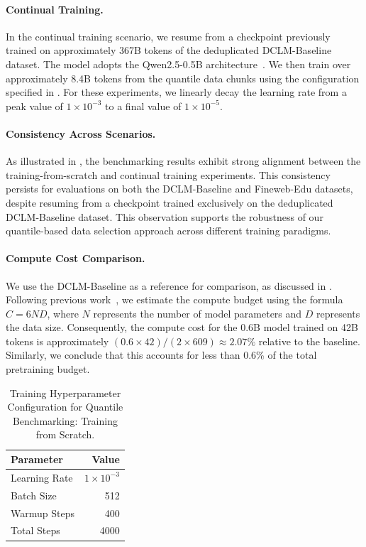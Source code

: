 \paragraph{Continual Training.}
In the continual training scenario, we resume from a checkpoint previously trained on approximately 367B tokens of the deduplicated DCLM-Baseline dataset. The model adopts the Qwen2.5-0.5B architecture~\citep{qwen2025qwen25technicalreport}. We then train over approximately 8.4B tokens from the quantile data chunks using the configuration specified in . For these experiments, we linearly decay the learning rate from a peak value of $1\times10^{-3}$ to a final value of $1\times10^{-5}$.

\paragraph{Consistency Across Scenarios.}
As illustrated in , the benchmarking results exhibit strong alignment between the training-from-scratch and continual training experiments. This consistency persists for evaluations on both the DCLM-Baseline and Fineweb-Edu datasets, despite resuming from a checkpoint trained exclusively on the deduplicated DCLM-Baseline dataset. This observation supports the robustness of our quantile-based data selection approach across different training paradigms.

\paragraph{Compute Cost Comparison.} We use the DCLM-Baseline as a reference for comparison, as discussed in . Following previous work~\cite{kaplan2025scaling}, we estimate the compute budget using the formula $C=6ND$, where $N$ represents the number of model parameters and $D$ represents the data size. Consequently, the compute cost for the 0.6B model trained on 42B tokens is approximately $(0.6\times 42) / (2\times 609)\approx 2.07\%$ relative to the baseline. Similarly, we conclude that this accounts for less than 0.6\% of the total pretraining budget.


\begin{table}[htbp]
\centering
\caption{Training Hyperparameter Configuration for Quantile Benchmarking: Training from Scratch.}
\label{tab:train_from_scratch}
\begin{tabular}{@{}lr@{}}
\toprule 
\textbf{Parameter} & \textbf{Value} \\
\midrule
Learning Rate & $1\times 10^{-3}$ \\
Batch Size & 512 \\
Warmup Steps & 400 \\
Total Steps & 4000 \\
\bottomrule
\end{tabular}
\end{table}

